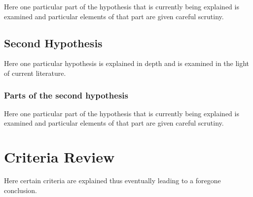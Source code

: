 Here one particular part of the hypothesis that is 
currently being explained is examined and particular
elements of that part are given careful scrutiny.


\subsection{Second Hypothesis}

Here one particular hypothesis is explained in depth
and is examined in the light of current literature.

\subsubsection{Parts of the second hypothesis}

Here one particular part of the hypothesis that is 
currently being explained is examined and particular
elements of that part are given careful scrutiny.

\section{Criteria Review}

Here certain criteria are explained thus eventually
leading to a foregone conclusion.



